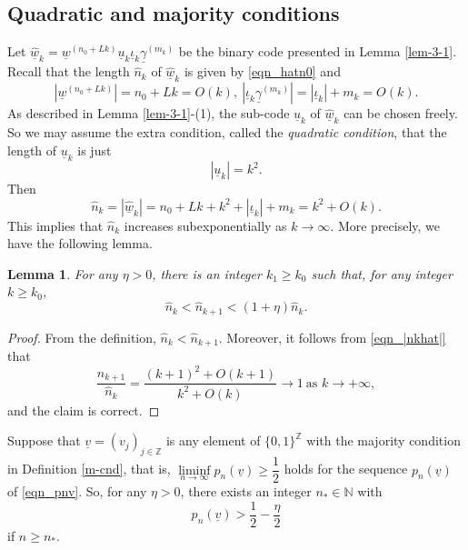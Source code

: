 \documentclass{amsart}
\newtheorem{lem}[thm]{Lemma}
\theoremstyle{definition}
\numberwithin{equation}{section}
\numberwithin{figure}{section}
\begin{document}
\subsection{Quadratic and majority conditions}\label{ss_quad_majority} 
Let $\underline{\widehat w}_{k}=\underline{w}^{(n_0+Lk)}\underline{u}_{k}\underline{\iota}_k\underline{\gamma}^{(m_k)}$ 
be the binary code presented in Lemma \ref{lem-3-1}.
Recall that the length $\widehat{n}_k$ of $\underline{\widehat w}_{k}$ is given by \eqref{eqn_hatn0} and 
$$
|\underline{w}^{(n_0+Lk)}|=n_{0}+Lk=O(k),\ 
|\underline{\iota}_k\underline{\gamma}^{(m_k)}|=|\underline{\iota}_k|+m_{k}=O(k).
$$
As described in Lemma \ref{lem-3-1}-(1), 
the sub-code $\underline{u}_{k}$ of 
$\widehat{\underline{w}}_k$ can be chosen freely.
So we may assume the extra condition, called the \emph{quadratic condition}, that 
the length of $\underline{u}_{k}$ is just  
\begin{equation}\label{eqn_k2}
 |\underline{u}_{k}|=k^{2}.
\end{equation}
Then 
\begin{equation}\label{eqn_|nkhat|}
\widehat n_k=|\widehat{\underline{w}}_k|=n_0+Lk+k^2+|\underline{\iota}_k|+m_k=k^2+O(k).
\end{equation}
This implies that $\widehat n_k$ 
increases subexponentially as $k\rightarrow \infty$.
More precisely, we have the following lemma.



\begin{lem}\label{subexp}
For any $\eta>0$, there is an integer $k_{1}\geq k_0$ such that, for any integer $k\geq k_{0}$, 
\[
\widehat n_{k}<\widehat n_{k+1}<(1+\eta) \widehat n_{k}. %
\]
\end{lem}
\begin{proof}
From the definition, $\widehat n_{k}<\widehat n_{k+1}$. 
Moreover, it follows from \eqref{eqn_|nkhat|} that  
\[
\frac{\widehat n_{k+1}}{\widehat n_{k}}
=\frac{(k+1)^{2}+O(k+1)}{k^{2}+O(k)}\rightarrow 1\ \text{as $k\rightarrow+\infty$},
\]
and the claim is correct.
\end{proof}


Suppose that $\underline{v}=(v_j)_{j\in\mathbb{Z}}$ is any element of $\{0,1\}^{\mathbb{Z}}$ 
with the majority condition in Definition \ref{m-cnd}, that is, $\liminf\limits_{n\rightarrow \infty}p_n(\underline{v})\geq 
\dfrac12$ holds for the sequence $p_n(\underline{v})$ of \eqref{eqn_pnv}.
So, for any $\eta>0$, there exists an integer $n_*\in\mathbb{N}$ with
\begin{equation}\label{eqn_pn}
p_n(\underline v)>\dfrac12-\frac{\eta}2
\end{equation}
if $n\geq n_*$.
\end{document}

